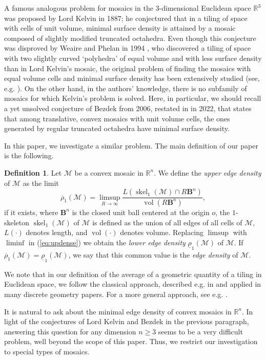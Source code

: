 \documentclass[twoside]{amsart}
\theoremstyle{definition}
\newtheorem{defn}{Definition}
\renewcommand{\Re}{\mathbb R}
\newcommand{\BB}{\mathbf B}
\newcommand{\M}{\mathcal{M}}
\DeclareMathOperator{\skel}{skel}
\DeclareMathOperator{\vol}{vol}
\begin{document}
A famous analogous problem for mosaics in the $3$-dimensional Euclidean space $\Re^3$ was proposed by Lord Kelvin \cite{Kelvin} in 1887; he conjectured that in a tiling of space with cells of unit volume, minimal surface density is attained by a mosaic composed of slightly modified truncated octahedra. Even though this conjecture was disproved by Weaire and Phelan in 1994 \cite{Weaire}, who discovered a tiling of space with two slightly curved `polyhedra' of equal volume and with less surface density than in Lord Kelvin's mosaic, the original problem of finding the mosaics with equal volume cells and minimal surface density has been extensively studied (see, e.g. \cite{Kusner, Gabbrielli, Oudet}). On the other hand, in the authors' knowledge, there is no subfamily of mosaics for which Kelvin's problem is solved. Here, in particular, we should recall a yet unsolved conjecture of Bezdek \cite{Bezdek} from 2006, restated in \cite{Langi} in 2022, that states that among translative, convex mosaics with unit volume cells, the ones generated by regular truncated octahedra have minimal surface density.

In this paper, we investigate a similar problem. The main definition of our paper is the following.

\begin{defn}\label{defn:density}
Let $\M$ be a convex mosaic in $\Re^n$. We define the \emph{upper edge density} of $\M$ as the limit
\begin{equation}\label{eq:updense}
\overline{\rho}_1(\M) = \limsup_{R \to \infty} \frac{L(\skel_1(\M) \cap R \BB^n)}{\vol(R \BB^n)},
\end{equation}
if it exists, where $\BB^n$ is the closed unit ball centered at the origin $o$, the $1$-skeleton $\skel_1(\M)$ of $\M$ is defined as the union of all edges of all cells of $\M$, $L(\cdot)$ denotes length, and $\vol(\cdot)$ denotes volume. Replacing $\limsup$ with $\liminf$ in (\ref{eq:updense}) we obtain the \emph{lower edge density} $\underline{\rho}_1(\M)$ of $\M$. If $\overline{\rho}_1(\M) = \underline{\rho}_1(\M)$, we say that this common value is the \emph{edge density} of $\M$.
\end{defn}

We note that in our definition of the average of a geometric quantity of a tiling in Euclidean space, we follow the classical approach, described e.g. in \cite{Lagerungen} and applied in many discrete geometry papers. For a more general approach, see e.g. \cite{BR02, BR04}. 

It is natural to ask about the minimal edge density of convex mosaics in $\Re^n$. In light of the conjectures of Lord Kelvin and Bezdek in the previous paragraph, answering this question for any dimension $n \geq 3$ seems to be a very difficult problem, well beyond the scope of this paper. Thus, we restrict our investigation to special types of mosaics.
\end{document}
